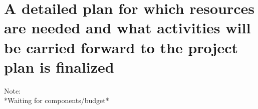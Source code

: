 \section{A detailed plan for which resources are needed and what activities will be carried forward to the project plan is finalized}

Note:\\
*Waiting for components/budget*
